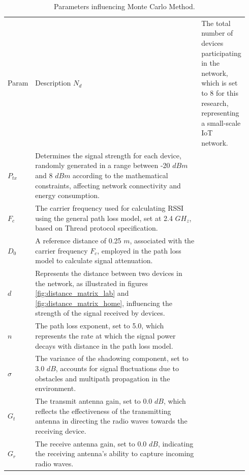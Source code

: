 \begin{longtable}{>{\hspace{0pt}}m{0.098\linewidth}>{\hspace{0pt}}m{0.842\linewidth}}
    \label{tab:monte_carlo_parameters}\\
    \caption{Parameters influencing Monte Carlo Method.}\\
    \hline\hline
    Param & Description
    \endfirsthead
    \hline
    $N_d$     & The total number of devices participating in the network, which is set to 8 for this research, representing a small-scale IoT network.                                                                              \\
    $P_{tx}$  & Determines the signal strength for each device, randomly generated in a range between -20 $dBm$ and 8 $dBm$ according to the mathematical constraints, affecting network connectivity and energy consumption.       \\
    $F_c$     & The carrier frequency used for calculating RSSI using the general path loss model, set at 2.4 ${GH}_z$, based on Thread protocol specification.                                                                     \\
    $D_0$     & A reference distance of 0.25 $m$, associated with the carrier frequency $F_c$, employed in the path loss model to calculate signal attenuation.                                                                     \\
    $d$       & Represents the distance between two devices in the network, as illustrated in figures \ref{fig:distance_matrix_lab} and \ref{fig:distance_matrix_home}, influencing the strength of the signal received by devices. \\
    $n$       & The path loss exponent, set to 5.0, which represents the rate at which the signal power decays with distance in the path loss model.                                                                                \\
    $\sigma$  & The variance of the shadowing component, set to 3.0 $dB$, accounts for signal fluctuations due to obstacles and multipath propagation in the environment.                                                           \\
    $G_t$     & The transmit antenna gain, set to 0.0 $dB$, which reflects the effectiveness of the transmitting antenna in directing the radio waves towards the receiving device.                                                 \\
    $G_r$     & The receive antenna gain, set to 0.0 $dB$, indicating the receiving antenna's ability to capture incoming radio waves.                                                                                              \\
    \hline\hline
\end{longtable}

